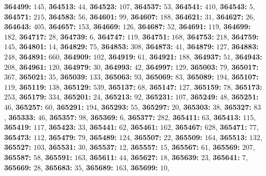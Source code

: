 \textsf{\bfseries 364499:} $145$, \textsf{\bfseries 364513:} $44$, \textsf{\bfseries 364523:} $107$, \textsf{\bfseries 364537:} $53$, \textsf{\bfseries 364541:} $410$, \textsf{\bfseries 364543:} $5$, \textsf{\bfseries 364571:} $215$, \textsf{\bfseries 364583:} $56$, \textsf{\bfseries 364601:} $99$, \textsf{\bfseries 364607:} $188$, \textsf{\bfseries 364621:} $31$, \textsf{\bfseries 364627:} $26$, \textsf{\bfseries 364643:} $405$, \textsf{\bfseries 364657:} $153$, \textsf{\bfseries 364669:} $126$, \textsf{\bfseries 364687:} $52$, \textsf{\bfseries 364691:} $119$, \textsf{\bfseries 364699:} $182$, \textsf{\bfseries 364717:} $28$, \textsf{\bfseries 364739:} $6$, \textsf{\bfseries 364747:} $119$, \textsf{\bfseries 364751:} $168$, \textsf{\bfseries 364753:} $218$, \textsf{\bfseries 364759:} $145$, \textsf{\bfseries 364801:} $14$, \textsf{\bfseries 364829:} $75$, \textsf{\bfseries 364853:} $308$, \textsf{\bfseries 364873:} $41$, \textsf{\bfseries 364879:} $127$, \textsf{\bfseries 364883:} $248$, \textsf{\bfseries 364891:} $660$, \textsf{\bfseries 364909:} $102$, \textsf{\bfseries 364919:} $61$, \textsf{\bfseries 364921:} $188$, \textsf{\bfseries 364937:} $51$, \textsf{\bfseries 364943:} $208$, \textsf{\bfseries 364961:} $120$, \textsf{\bfseries 364979:} $30$, \textsf{\bfseries 364993:} $42$, \textsf{\bfseries 364997:} $129$, \textsf{\bfseries 365003:} $79$, \textsf{\bfseries 365017:} $367$, \textsf{\bfseries 365021:} $35$, \textsf{\bfseries 365039:} $133$, \textsf{\bfseries 365063:} $93$, \textsf{\bfseries 365069:} $83$, \textsf{\bfseries 365089:} $194$, \textsf{\bfseries 365107:} $119$, \textsf{\bfseries 365119:} $138$, \textsf{\bfseries 365129:} $539$, \textsf{\bfseries 365137:} $68$, \textsf{\bfseries 365147:} $127$, \textsf{\bfseries 365159:} $78$, \textsf{\bfseries 365173:} $253$, \textsf{\bfseries 365179:} $334$, \textsf{\bfseries 365201:} $24$, \textsf{\bfseries 365213:} $92$, \textsf{\bfseries 365231:} $107$, \textsf{\bfseries 365249:} $48$, \textsf{\bfseries 365251:} $46$, \textsf{\bfseries 365257:} $60$, \textsf{\bfseries 365291:} $194$, \textsf{\bfseries 365293:} $55$, \textsf{\bfseries 365297:} $20$, \textsf{\bfseries 365303:} $38$, \textsf{\bfseries 365327:} $83$, \textsf{\bfseries 365333:} $46$, \textsf{\bfseries 365357:} $98$, \textsf{\bfseries 365369:} $6$, \textsf{\bfseries 365377:} $282$, \textsf{\bfseries 365411:} $63$, \textsf{\bfseries 365413:} $115$, \textsf{\bfseries 365419:} $117$, \textsf{\bfseries 365423:} $33$, \textsf{\bfseries 365441:} $62$, \textsf{\bfseries 365461:} $162$, \textsf{\bfseries 365467:} $628$, \textsf{\bfseries 365471:} $77$, \textsf{\bfseries 365473:} $112$, \textsf{\bfseries 365479:} $79$, \textsf{\bfseries 365489:} $124$, \textsf{\bfseries 365507:} $22$, \textsf{\bfseries 365509:} $164$, \textsf{\bfseries 365513:} $132$, \textsf{\bfseries 365527:} $103$, \textsf{\bfseries 365531:} $30$, \textsf{\bfseries 365537:} $12$, \textsf{\bfseries 365557:} $15$, \textsf{\bfseries 365567:} $61$, \textsf{\bfseries 365569:} $207$, \textsf{\bfseries 365587:} $58$, \textsf{\bfseries 365591:} $163$, \textsf{\bfseries 365611:} $44$, \textsf{\bfseries 365627:} $18$, \textsf{\bfseries 365639:} $23$, \textsf{\bfseries 365641:} $7$, \textsf{\bfseries 365669:} $28$, \textsf{\bfseries 365683:} $35$, \textsf{\bfseries 365689:} $163$, \textsf{\bfseries 365699:} $10$, 
